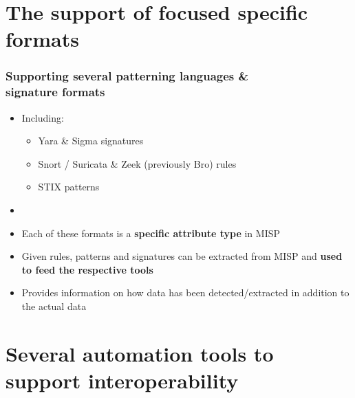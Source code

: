 \section{The support of focused specific formats}

\begin{frame}
    \frametitle{Supporting several patterning languages \& \\ signature formats}
    \begin{itemize}
        \item Including:
        \begin{itemize}
            \item Yara \& Sigma signatures
            \item Snort / Suricata \& Zeek (previously Bro) rules
            \item STIX patterns
        \end{itemize}
        \item []
        \item Each of these formats is a \textbf{specific attribute type} in MISP
        \item Given rules, patterns and signatures can be extracted from MISP and \textbf{used to feed the respective tools}
        \item Provides information on how data has been detected/extracted in addition to the actual data
    \end{itemize}
\end{frame}

\section{Several automation tools to \\ support interoperability}

